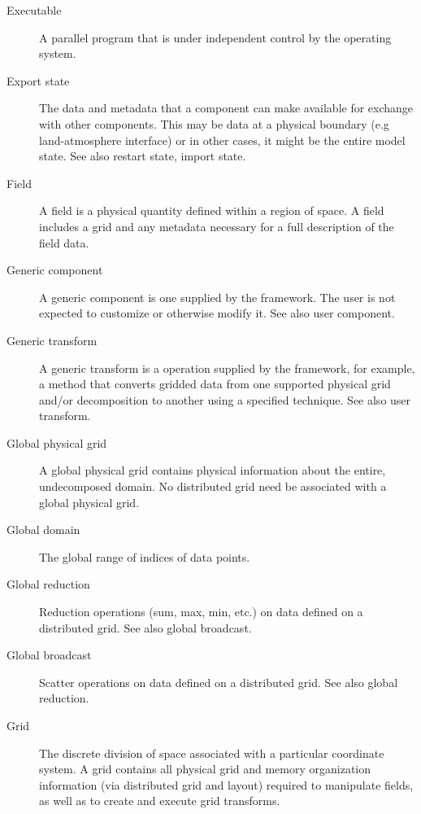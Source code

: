 \begin{description}
\item[Executable] \label{glos:Exec} 
  A parallel program that is under independent control by the operating 
  system.

\item[Export state] \label{glos:ExportState} The data and 
  metadata that a component can make available for exchange 
  with other components. This may be data at a physical boundary 
  (e.g land-atmosphere interface) or in other cases, it might be the 
  entire model state.  See also restart state, import state.

\item[Field] \label{glos:Field} A field is a physical quantity
  defined within a region of space.  A field includes a grid 
  and any metadata necessary for a full description of the field data.

\item[Generic component] \label{glos:GenericTrans} A generic component
  is one supplied by the framework.  The user is not expected to 
  customize or otherwise modify it.  See also user component.

\item[Generic transform] \label{glos:GenericTrans} A generic transform 
  is a operation supplied by the framework, for example, a method 
  that converts gridded data from one supported physical grid and/or 
  decomposition to another using a specified technique.  See also user 
  transform.

\item[Global physical grid] \label{glos:GlobPhysGrid} 
  A global physical grid contains physical information about the entire, 
  undecomposed domain.  No distributed grid need be associated with a global 
  physical grid.  

\item[Global domain] \label{glos:GlobDomain}
  The global range of indices of data points.

\item[Global reduction] \label{glos:GlobReduction} 
  Reduction operations (sum, max, min, etc.) on
  data defined on a distributed grid.  See also global broadcast.

\item[Global broadcast] \label{glos:GlobBroadcast}
  Scatter operations on data defined on a distributed grid.
  See also global reduction.

\item[Grid] \label{glos:Grid} The discrete division of space associated with
  a particular coordinate system.  A grid contains all physical grid and memory 
  organization information (via distributed grid and layout) required to manipulate 
  fields, as well as to create and execute grid transforms. 


\end{description}
